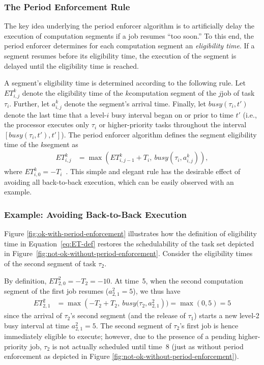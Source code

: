 \subsubsection{The Period Enforcement Rule}

The key idea underlying the period enforcer algorithm is to artificially delay the execution of computation segments if a job resumes ``too soon.'' To this end,  the period enforcer determines for each computation segment an \emph{eligibility time}. If a segment resumes  before its eligibility time, the execution of the segment is delayed until the eligibility time is reached.

A segment's eligibility time is determined according to the following rule. Let $ET_{i,j}^k$ denote the eligibility time of the $k$\xth computation segment of the $j$\xth job of task $\tau_i$. Further, let $a^k_{i,j}$ denote the segment's arrival time. Finally, let $\mathit{busy}(\tau_i, t')$ denote the last time that a level-$i$ busy interval began on or prior to time $t'$ (i.e., the processor executes only $\tau_i$ or higher-priority tasks throughout the interval $[\mathit{busy}(\tau_i, t'), t']$). The period enforcer algorithm defines the segment eligibility time of the $k$\xth segment as
\begin{align}\label{eq:ET-def}
	ET_{i,j}^k & = \max\left(ET_{i,j-1}^k + T_i,\ \mathit{busy}(\tau_i, a^k_{i,j})\right),
\end{align}
where $ET_{i,0}^k = -T_i$~\cite[Section 3.1]{Raj:suspension1991}. This simple and elegant rule has the desirable effect of avoiding all back-to-back execution, which can be easily observed with an example.

\subsubsection{Example: Avoiding Back-to-Back Execution}

Figure \ref{fig:ok-with-period-enforcement} illustrates how the definition of eligibility time in Equation~\ref{eq:ET-def} restores the schedulability of the task set depicted in Figure~\ref{fig:not-ok-without-period-enforcement}. Consider the eligibility times of the second segment of task $\tau_2$.

By definition,  $ET_{2,0}^2 = -T_2 = -10$. At time~5, when the second computation segment of the first job resumes ($a_{2,1}^2 = 5$), we thus have
\begin{align*}
	ET_{2,1}^2 & = \max\left(-T_2 + T_2,\ \mathit{busy}(\tau_2, a_{2,1}^2\right) ) = \max(0, 5) = 5
\end{align*}
since the arrival of $\tau_2$'s second segment (and the release of $\tau_1$) starts a new level-2 busy interval at time $a_{2,1}^2 = 5$. The second segment of $\tau_2$'s first job is hence immediately eligible to execute; however, due to the presence of a pending higher-priority job, $\tau_2$ is not actually scheduled until time~8 (just as without period enforcement as depicted in Figure \ref{fig:not-ok-without-period-enforcement}).


